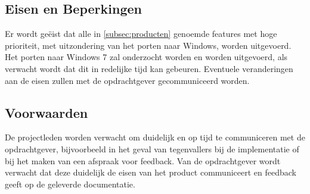 \subsection{Eisen en Beperkingen}
Er wordt ge\"eist dat alle in \ref{subsec:producten} genoemde features met hoge prioriteit, met uitzondering van het porten naar Windows, worden uitgevoerd. Het porten naar Windows 7 zal onderzocht worden en worden uitgevoerd, als verwacht wordt dat dit in redelijke tijd kan gebeuren. Eventuele veranderingen aan de eisen zullen met de opdrachtgever gecommuniceerd worden.

\subsection{Voorwaarden}
De projectleden worden verwacht om duidelijk en op tijd te communiceren met de opdrachtgever, bijvoorbeeld in het geval van tegenvallers bij de implementatie of bij het maken van een afspraak voor feedback. Van de opdrachtgever wordt verwacht dat deze duidelijk de eisen van het product communiceert en feedback geeft op de geleverde documentatie.  
